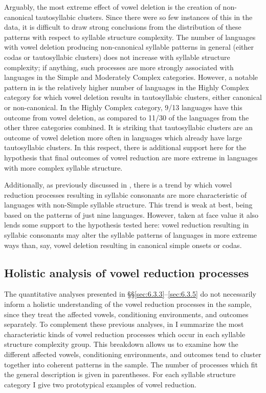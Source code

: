   Arguably, the most extreme effect of vowel deletion is the creation of non-canonical tautosyllabic clusters. Since there were so few instances of this in the data, it is difficult to draw strong conclusions from the distribution of these patterns with respect to syllable structure complexity. The number of languages with vowel deletion producing non-canonical syllable patterns in general (either codas or tautosyllabic clusters) does not increase with syllable structure complexity; if anything, such processes are more strongly associated with languages in the Simple and Moderately Complex categories. However, a notable pattern in  is the relatively higher number of languages in the Highly Complex category for which vowel deletion results in tautosyllabic clusters, either canonical or non-canonical. In the Highly Complex category, 9/13 languages have this outcome from vowel deletion, as compared to 11/30 of the languages from the other three categories combined. It is striking that tautosyllabic clusters are an outcome of vowel deletion more often in languages which already have large tautosyllabic clusters. In this respect, there is additional support here for the hypothesis that final outcomes of vowel reduction are more extreme in languages with more complex syllable structure.   

  Additionally, as previously discussed in , there is a trend by which vowel reduction processes resulting in syllabic consonants are more characteristic of languages with non-Simple syllable structure. This trend is weak at best, being based on the patterns of just nine languages. However, taken at face value it also lends some support to the hypothesis tested here: vowel reduction resulting in syllabic consonants may alter the syllable patterns of languages in more extreme ways than, say, vowel deletion resulting in canonical simple onsets or codas.

\subsection{Holistic analysis of vowel reduction processes}\label{sec:6.3.6}

  The quantitative analyses presented in §§\ref{sec:6.3.3}--\ref{sec:6.3.5} do not necessarily inform a holistic understanding of the vowel reduction processes in the sample, since they treat the affected vowels, conditioning environments, and outcomes separately. To complement these previous analyses, in  I summarize the most characteristic kinds of vowel reduction processes which occur in each syllable structure complexity group. This breakdown allows us to examine how the different affected vowels, conditioning environments, and outcomes tend to cluster together into coherent patterns in the sample. The number of processes which fit the general description is given in parentheses. For each syllable structure category I give two prototypical examples of vowel reduction.

